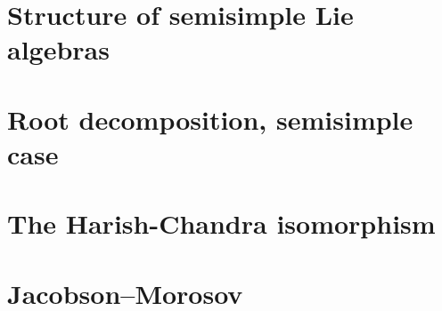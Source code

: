 
\section{Structure of semisimple Lie algebras}



\section{Root decomposition, semisimple case}






\section{The Harish-Chandra isomorphism}


\section{Jacobson--Morosov}












